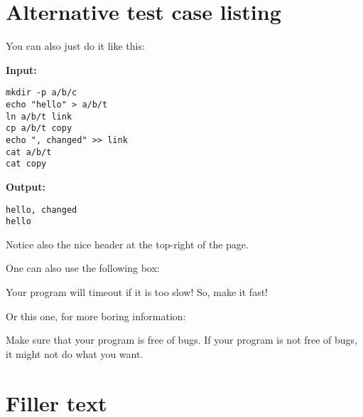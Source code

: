 \documentclass{progr-assgt}
\begin{document}

\section{Alternative test case listing}
You can also just do it like this:

\textbf{Input:}
\begin{lstlisting}[style=nostyle]
mkdir -p a/b/c
echo "hello" > a/b/t
ln a/b/t link
cp a/b/t copy
echo ", changed" >> link
cat a/b/t
cat copy
\end{lstlisting}

\textbf{Output:}
\begin{lstlisting}[style=nostyle]
hello, changed
hello
\end{lstlisting}

Notice also the nice header at the top-right of the page.

One can also use the following box:

\begin{alert}
    Your program will timeout if it is too slow! So, make it fast!
\end{alert}

Or this one, for more boring information:
\begin{note}
    Make sure that your program is free of bugs. If your program is not free of bugs, it might not do what you want.
\end{note}

\section{Filler text}
\lipsum[1-3]
\end{document}
